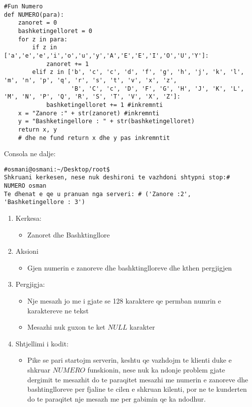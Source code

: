 \documentclass[]{article}
\begin{document}
\begin{lstlisting}
#Fun Numero
def NUMERO(para):
    zanoret = 0
    bashketingelloret = 0
    for z in para:
        if z in ['a','e','e','i','o','u','y','A','E','E','I','O','U','Y']:
            zanoret += 1
        elif z in ['b', 'c', 'c', 'd', 'f', 'g', 'h', 'j', 'k', 'l', 'm', 'n', 'p', 'q', 'r', 's', 't', 'v', 'x', 'z',
                   'B', 'C', 'c', 'D', 'F', 'G', 'H', 'J', 'K', 'L', 'M', 'N', 'P', 'Q', 'R', 'S', 'T', 'V', 'X', 'Z']:
            bashketingelloret += 1 #inkremnti
    x = "Zanore :" + str(zanoret) #inkremnti
    y = "Bashketingellore : " + str(bashketingelloret)
    return x, y
    # dhe ne fund return x dhe y pas inkremntit

\end{lstlisting}
\vspace*{1cm}
\noindent Consola ne dalje:
\begin{lstlisting}
#osmani@osmani:~/Desktop/root$
Shkruani kerkesen, nese nuk deshironi te vazhdoni shtypni stop:# NUMERO osman
Te dhenat e qe u pranuan nga serveri: # ('Zanore :2', 'Bashketingellore : 3')
\end{lstlisting}
\begin{enumerate}
\item Kerkesa:
\begin{itemize}
\item Zanoret dhe Bashktingllore
\end{itemize}
\item Aksioni
\begin{itemize}
\item Gjen numerin e zanoreve dhe bashktinglloreve dhe kthen pergjigjen
\end{itemize}
\item Pergjigja:
\begin{itemize}
\item Nje mesazh jo me i gjate se 128 karaktere qe permban numrin e karaktereve ne tekst
\item Mesazhi nuk guxon te ket $NULL$ karakter
\end{itemize}
\item Shtjellimi i kodit:
\begin{itemize}
\item Pike se pari startojm serverin, keshtu qe vazhdojm te klienti duke e  shkruar $NUMERO$ funskionin, nese nuk ka ndonje problem gjate dergimit te mesazhit do te paraqitet mesazhi me numerin e zanoreve dhe bashtinglloreve per  fjaline te cilen e shkruan kilenti, por ne te kunderten do te paraqitet nje mesazh me per gabimin qe ka ndodhur.
\end{itemize}
\end{enumerate}
\newpage
\end{document}
